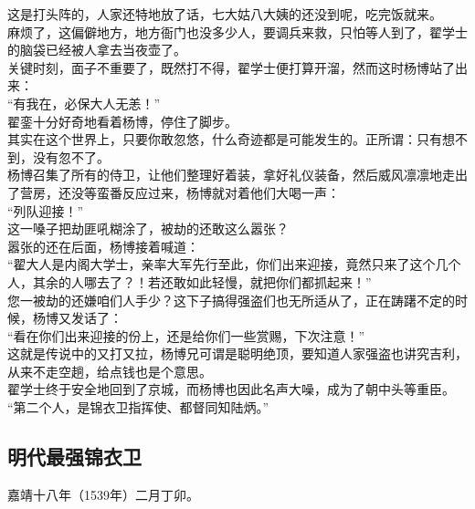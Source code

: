 \begin{multicols}{\theparacolNo}
这是打头阵的，人家还特地放了话，七大姑八大姨的还没到呢，吃完饭就来。\\

麻烦了，这偏僻地方，地方衙门也没多少人，要调兵来救，只怕等人到了，翟学士的脑袋已经被人拿去当夜壶了。\\

关键时刻，面子不重要了，既然打不得，翟学士便打算开溜，然而这时杨博站了出来：\\

“有我在，必保大人无恙！”\\

翟銮十分好奇地看着杨博，停住了脚步。\\

其实在这个世界上，只要你敢忽悠，什么奇迹都是可能发生的。正所谓：只有想不到，没有忽不了。\\

杨博召集了所有的侍卫，让他们整理好着装，拿好礼仪装备，然后威风凛凛地走出了营房，还没等蛮番反应过来，杨博就对着他们大喝一声：\\

“列队迎接！”\\

这一嗓子把劫匪吼糊涂了，被劫的还敢这么嚣张？\\

嚣张的还在后面，杨博接着喊道：\\

“翟大人是内阁大学士，亲率大军先行至此，你们出来迎接，竟然只来了这个几个人，其余的人哪去了？！若还敢如此轻慢，就把你们都抓起来！”\\

您一被劫的还嫌咱们人手少？这下子搞得强盗们也无所适从了，正在踌躇不定的时候，杨博又发话了：\\

“看在你们出来迎接的份上，还是给你们一些赏赐，下次注意！”\\

这就是传说中的又打又拉，杨博兄可谓是聪明绝顶，要知道人家强盗也讲究吉利，从来不走空趟，给点钱也是个意思。\\

翟学士终于安全地回到了京城，而杨博也因此名声大噪，成为了朝中头等重臣。\\

“第二个人，是锦衣卫指挥使、都督同知陆炳。”\\

\subsection{明代最强锦衣卫}
嘉靖十八年（1539年）二月丁卯。\\


\end{multicols}
